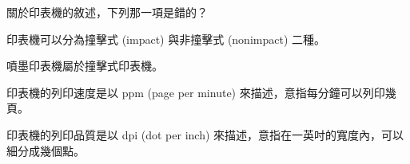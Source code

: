 \ifx\ntpcNinetyThree\undefined[93學年基北區] \fi
關於印表機的敘述，下列那一項是錯的？
  \begin{optionlist}
  \item 印表機可以分為撞擊式 (impact) 與非撞擊式 (nonimpact) 二種。
  \item 噴墨印表機屬於撞擊式印表機。\label{ntpc-93-a2}
  \item 印表機的列印速度是以 ppm (page per minute) 來描述，意指每分鐘可以列印幾頁。 
  \item 印表機的列印品質是以 dpi (dot per inch) 來描述，意指在一英吋的寬度內，可以細分成幾個點。
  \end{optionlist}